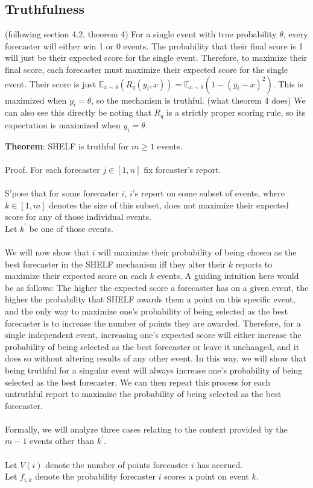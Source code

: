 \documentclass[letterpaper,12pt]{article}
\newcommand{\E}{\mathbb{E}}
\newcommand{\1}{\mathbbm{1}}
\begin{document}
\subsection{Truthfulness}
(following section 4.2, theorem 4) For a single event with true probability $\theta$, every forecaster will either win 1 or 0 events. The probability that their final score is 1 will just be their expected score for the single event. Therefore, to maximize their final score, each forecaster must maximize their expected score for the single event. Their score is just $\E_{x \sim \theta}(R_q(y_i, x)) = \E_{x \sim \theta}(1 - (y_i - x)^2)$. This is maximized when $y_i = \theta$, so the mechanism is truthful. (what theorem 4 does) We can also see this directly be noting that $R_q$ is a strictly proper scoring rule, so its expectation is maximized when $y_i = \theta$. 

\textbf{Theorem}: SHELF is truthful for $m \geq 1$ events.\\\\
Proof. For each forecaster $j \in [1, n]$ fix forcaster's report.\\\\
S'pose that for some forecaster $i$, $i$'s report on some subset of events, where $k \in [1, m]$ denotes the size of this subset, does not maximize their expected score for any of those individual events.\\
Let $k^\prime$ be one of those events.\\\\
We will now show that $i$ will maximize their probability of being chosen as the best forecaster in the SHELF mechanism iff they alter their $k$ reports to maximize their expected score on each $k$ events. A guiding intuition here would be as follows: The higher the expected score a forecaster has on a given event, the higher the probability that SHELF awards them a point on this specific event, and the only way to maximize one's probability of being selected as the best forecaster is to increase the number of points they are awarded. Therefore, for a single independent event, increasing one's expected score will either increase the probability of being selected as the best forecaster or leave it unchanged, and it does so without altering results of any other event. In this way, we will show that being truthful for a singular event will always increase one's probability of being selected as the best forecaster. We can then repeat this process for each untruthful report to maximize the probability of being selected as the best forecaster.\\\\
Formally, we will analyze three cases relating to the context provided by the $m - 1$ events other than $k^\prime$.\\\\
Let $V(i)$ denote the number of points forecaster $i$ has accrued.\\
Let $f_{i,k}$ denote the probability forecaster $i$ scores a point on event $k$.\\
\end{document}
